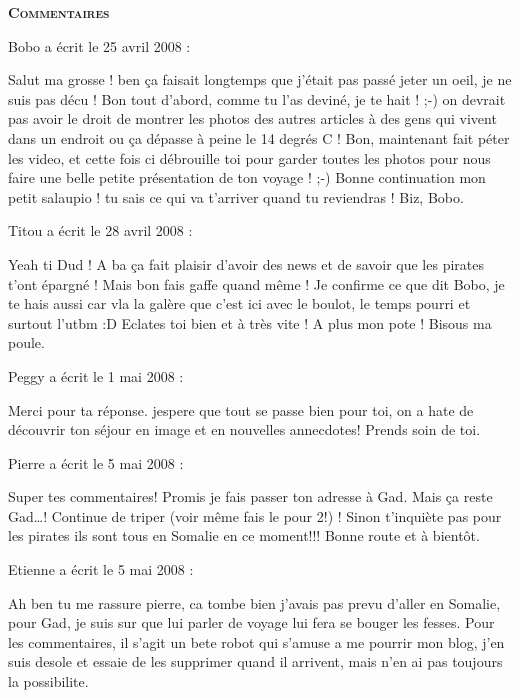 \bigskip
\textbf{\textsc{Commentaires}}

\medskip
Bobo a écrit le 25 avril 2008 :
\begin{displayquote}
Salut ma grosse ! ben ça faisait longtemps que j'était pas passé jeter un oeil, je ne suis pas décu !
Bon tout d'abord, comme tu l'as deviné, je te hait ! ;-) on devrait pas avoir le droit de montrer les photos des autres articles à des gens qui vivent dans un endroit ou ça dépasse à peine le 14 degrés C !
Bon, maintenant fait péter les video, et cette fois ci débrouille toi pour garder toutes les photos pour nous faire une belle petite présentation de ton voyage ! ;-)
Bonne continuation mon petit salaupio ! tu sais ce qui va t'arriver quand tu reviendras !
Biz, Bobo.
\end{displayquote}

\medskip
Titou a écrit le 28 avril 2008 :
\begin{displayquote}
Yeah ti Dud !
A ba ça fait plaisir d'avoir des news et de savoir que les pirates t'ont épargné ! Mais bon fais gaffe quand même !
Je confirme ce que dit Bobo, je te hais aussi car vla la galère que c'est ici avec le boulot, le temps pourri et surtout l'utbm :D Eclates toi bien et à très vite !
A plus mon pote !
Bisous ma poule.
\end{displayquote}

\medskip
Peggy a écrit le 1 mai 2008 :
\begin{displayquote}
Merci pour ta réponse. jespere que tout se passe bien pour toi, on a hate de découvrir ton séjour en image et en nouvelles annecdotes!
Prends soin de toi.
\end{displayquote}

\medskip
Pierre a écrit le 5 mai 2008 :
\begin{displayquote}
Super tes commentaires!
Promis je fais passer ton adresse à Gad.
Mais ça reste Gad\dots!
Continue de triper (voir même fais le pour 2!) !
Sinon t'inquiète pas pour les pirates ils sont tous en Somalie en ce moment!!!
Bonne route et à bientôt.
\end{displayquote}

\medskip
Etienne a écrit le 5 mai 2008 :
\begin{displayquote}
Ah ben tu me rassure pierre, ca tombe bien j'avais pas prevu d'aller en Somalie, pour Gad, je suis sur que lui parler de voyage lui fera se bouger les fesses.
Pour les commentaires, il s'agit un bete robot qui s'amuse a me pourrir mon blog, j'en suis desole et essaie de les supprimer quand il arrivent, mais n'en ai pas toujours la possibilite.
\end{displayquote}

